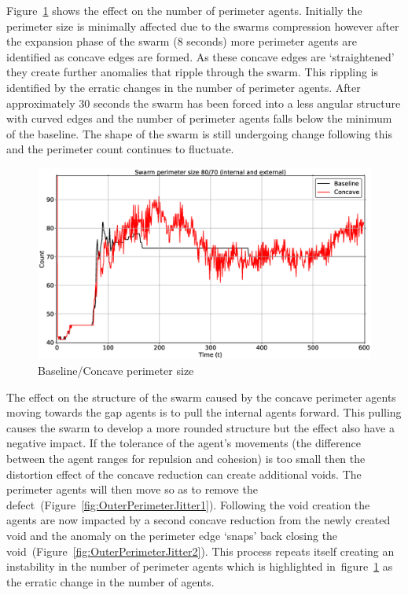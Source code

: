 Figure~\ref{concave:BaselineConcavePerimeter} shows the effect on the number of perimeter agents. Initially the perimeter size is minimally affected due to the swarms compression however after the expansion phase of the swarm (8 seconds) more perimeter agents are identified as concave edges are formed. As these concave edges are `straightened' they create further anomalies that ripple through the swarm. This rippling is identified by the erratic changes in the number of perimeter agents. After approximately 30 seconds the swarm has been forced into a less angular structure with curved edges and the number of perimeter agents falls below the minimum of the baseline. The shape of the swarm is still undergoing change following this and the perimeter count continues to fluctuate.
\begin{figure}[H]
\begin{center}
\includegraphics[width=14cm]{CHAPTER-7/figures/BaselineConcavePerimeter}
\end{center}
\caption{Baseline/Concave perimeter size\label{concave:BaselineConcavePerimeter}}
\end{figure}

The effect on the structure of the swarm caused by the concave perimeter agents moving towards the gap agents is to pull the internal agents forward. This pulling causes the swarm to develop a more rounded structure but the effect also have a negative impact. If the tolerance of the agent's movements (the difference between the agent ranges for repulsion and cohesion) is too small then the distortion effect of the concave reduction can create additional voids. The perimeter agents will then move so as to remove the defect~(Figure~\ref{fig:OuterPerimeterJitter1}). Following the void creation the agents are now impacted by a second concave reduction from the newly created void and the anomaly on the perimeter edge `snaps' back closing the void~(Figure~\ref{fig:OuterPerimeterJitter2}). This process repeats itself creating an instability in the number of perimeter agents which is highlighted in~figure~\ref{concave:BaselineConcavePerimeter} as the erratic change in the number of agents. 

